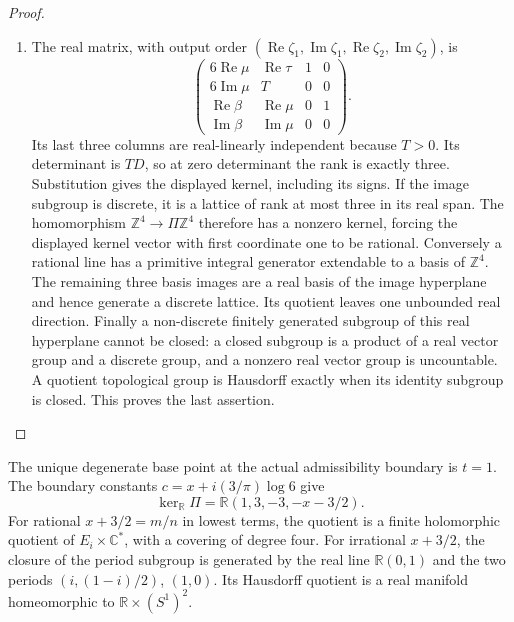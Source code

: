 \begin{proof}
\begin{enumerate}[label=\arabic*.,leftmargin=*]
\item The real matrix, with output order
\((\operatorname{Re}\zeta_1,\operatorname{Im}\zeta_1,
\operatorname{Re}\zeta_2,\operatorname{Im}\zeta_2)\), is
\[
 \begin{pmatrix}6\operatorname{Re}\mu&\operatorname{Re}\tau&1&0\\
 6\operatorname{Im}\mu&T&0&0\\
 \operatorname{Re}\beta&\operatorname{Re}\mu&0&1\\
 \operatorname{Im}\beta&\operatorname{Im}\mu&0&0\end{pmatrix}.
\]
Its last three columns are real-linearly independent because \(T>0\).
Its determinant is \(TD\), so at zero determinant the rank is exactly
three. Substitution gives the displayed kernel, including its signs.
If the image subgroup is discrete, it is a lattice of rank at most three
in its real span. The homomorphism \(\mathbb Z^4\to\Pi\mathbb Z^4\)
therefore has a nonzero kernel, forcing the displayed kernel vector with
first coordinate one to be rational. Conversely a rational line has a
primitive integral generator extendable to a basis of \(\mathbb Z^4\).
The remaining three basis images are a real basis of the image hyperplane
and hence generate a discrete lattice. Its quotient leaves one unbounded
real direction. Finally a non-discrete finitely generated subgroup of
this real hyperplane cannot be closed: a closed subgroup is a product of
a real vector group and a discrete group, and a nonzero real vector group
is uncountable. A quotient topological group is Hausdorff exactly when its
identity subgroup is closed. This proves the last assertion.
\end{enumerate}
\end{proof}

\begin{proposition}\hypertarget{tag-01QN}{}\label{fam:src:C.3.2}\label{fam:st:C.3.2}

The unique degenerate base point at the actual admissibility boundary is
\(t=1\). The boundary constants
\(c=x+i(3/\pi)\log6\) give
\[
 \ker_{\mathbb R}\Pi=\mathbb R(1,3,-3,-x-3/2).
\]
For rational $x+3/2=m/n$ in lowest terms, the quotient is a
finite holomorphic quotient of $E_i\times\mathbb C^*$, with a covering
of degree four. For irrational \(x+3/2\), the closure of the period subgroup is generated
by the real line \(\mathbb R(0,1)\) and the two periods
\((i,(1-i)/2)\), \((1,0)\). Its Hausdorff quotient is a real manifold
homeomorphic to \(\mathbb R\times(S^1)^2\).
\end{proposition}


